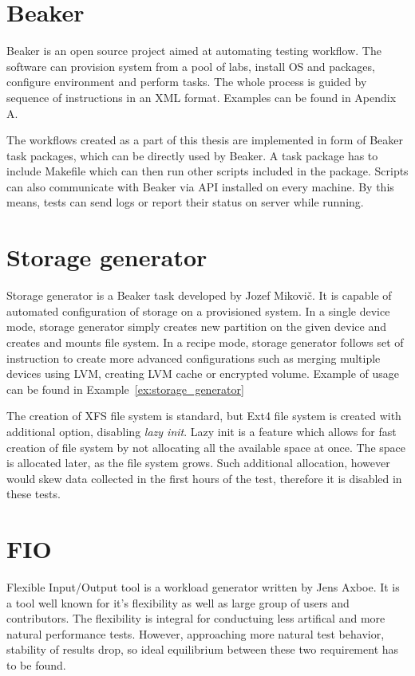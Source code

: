 \documentclass[
  color, %
  table, %
  lof,   %
  lot,   %
]{fithesis3}
\begin{document}
\section{Beaker}
Beaker is an open source project aimed at automating testing workflow. The software can provision system from a pool of labs, install OS and packages, configure environment and perform tasks. The whole process is guided by sequence of instructions in an XML format. Examples can be found in Apendix A.

The workflows created as a part of this thesis are implemented in form of Beaker task packages, which can be directly used by Beaker. A task package has to include Makefile which can then run other scripts included in the package. Scripts can also communicate with Beaker via API installed on every machine.  By this means, tests can send logs or report their status on server while running.

\section{Storage generator}
Storage generator is a Beaker task developed by Jozef Mikovič. It is capable of automated configuration of storage on a provisioned system. In a single device mode, storage generator simply creates new partition on the given device and creates and mounts file system. In a recipe mode, storage generator follows set of instruction to create more advanced configurations such as merging multiple devices using LVM, creating LVM cache or encrypted volume. Example of usage can be found in Example~\ref{ex:storage_generator}

The creation of XFS file system is standard, but Ext4 file system is created with additional option, disabling \emph{lazy init}. Lazy init is a feature which allows for fast creation of file system by not allocating all the available space at once. The space is allocated later, as the file system grows. Such additional allocation, however would skew data collected in the first hours of the test, therefore it is disabled in these tests.

\section{FIO}
Flexible Input/Output tool is a workload generator written by Jens Axboe. It is a tool well known for it's flexibility as well as large group of users and contributors. The flexibility is integral for conductuing less artifical and more natural performance tests. However, approaching more natural test behavior, stability of results drop, so ideal equilibrium between these two requirement has to be found.
\end{document}
